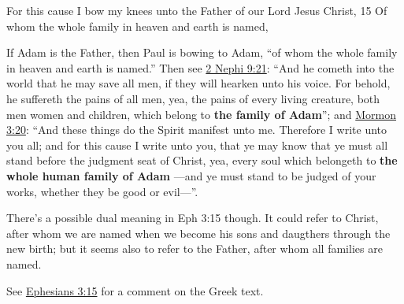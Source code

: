 \begin{compactdesc}
\begin{compactitem}
					\end{compactitem}
				\item[{\hyperref[EPHESIANS-3-14]{Ephesians 3:14--15}}] For this cause I bow my knees unto the Father of our Lord Jesus Christ, 15 Of whom the whole family in heaven and earth is named,
					\begin{compactitem}
					\item If Adam is the Father, then Paul is bowing to Adam, ``of whom the whole family in heaven and earth is named.'' Then see \hyperref[2NEPHI-9-21]{2 Nephi 9:21}: ``And he cometh into the world that he may save all men, if they will hearken unto his voice. For behold, he suffereth the pains of all men, yea, the pains of every living creature, both men women and children, which belong to \textbf{the family of Adam}''; and \hyperref[MORMOM-3-20]{Mormon 3:20}: ``And these things do the Spirit manifest unto me. Therefore I write unto you all; and for this cause I write unto you, that ye may know that ye must all stand before the judgment seat of Christ, yea, every soul which belongeth to \textbf{the whole human family of Adam} ---and ye must stand to be judged of your works, whether they be good or evil---''.
					\item There's a possible dual meaning in Eph 3:15 though. It could refer to Christ, after whom we are named when we become his sons and daugthers through the new birth; but it seems also to refer to the Father, after whom all families are named.
					\item See \hyperref[EPHESIANS-3-15]{Ephesians 3:15} for a comment on the Greek text.
					\end{compactitem}
			\end{compactdesc}
		
			
				
